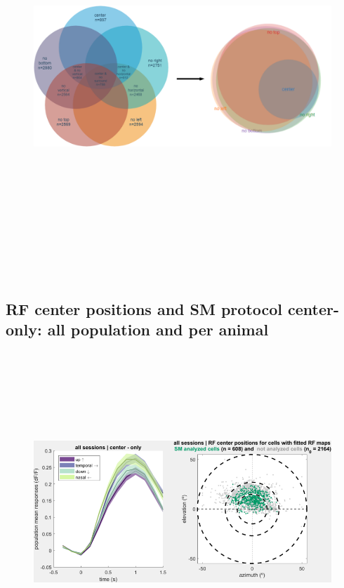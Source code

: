 \begin{figure}[H] \centering \includegraphics[width=15cm,height=15cm,keepaspectratio]{Figures/7.Results/data/SMdata.png} 
\end{figure}

\subsection{RF center positions and SM protocol center-only: all population and per animal}

\begin{figure}[H] \centering \includegraphics[width=12cm,height=12cm,keepaspectratio]{Figures/7.Results/population/sel/1_popPlots_rfPositions.png} 
\end{figure}

